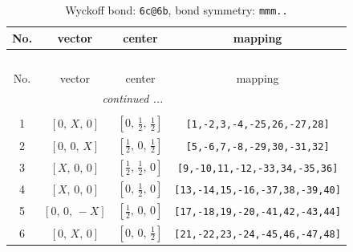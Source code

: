 \documentclass[fleqn,8pt]{jsarticle}
\begin{document}
\begin{longtable}{cccc}
\caption{Wyckoff bond: {\tt 6c@6b}, bond symmetry: {\tt mmm..}}
 \\
 \hline \hline
No. & vector & center & mapping \\ \hline \endfirsthead

\multicolumn{3}{l}{\tablename\ \thetable{}} \\
 \hline \hline
No. & vector & center & mapping \\ \hline \endhead

 \hline \hline
\multicolumn{3}{r}{\footnotesize\it continued ...} \\ \endfoot

 \hline \hline
\multicolumn{3}{r}{} \\ \endlastfoot

1 & $\left[ 0,\, X,\, 0 \right]$ & $\left[ 0,\, \frac{1}{2},\, \frac{1}{2} \right]$ & {\tt [1,-2,3,-4,-25,26,-27,28]} \\ \hline
2 & $\left[ 0,\, 0,\, X \right]$ & $\left[ \frac{1}{2},\, 0,\, \frac{1}{2} \right]$ & {\tt [5,-6,7,-8,-29,30,-31,32]} \\ \hline
3 & $\left[ X,\, 0,\, 0 \right]$ & $\left[ \frac{1}{2},\, \frac{1}{2},\, 0 \right]$ & {\tt [9,-10,11,-12,-33,34,-35,36]} \\ \hline
4 & $\left[ X,\, 0,\, 0 \right]$ & $\left[ 0,\, \frac{1}{2},\, 0 \right]$ & {\tt [13,-14,15,-16,-37,38,-39,40]} \\ \hline
5 & $\left[ 0,\, 0,\, - X \right]$ & $\left[ \frac{1}{2},\, 0,\, 0 \right]$ & {\tt [17,-18,19,-20,-41,42,-43,44]} \\ \hline
6 & $\left[ 0,\, X,\, 0 \right]$ & $\left[ 0,\, 0,\, \frac{1}{2} \right]$ & {\tt [21,-22,23,-24,-45,46,-47,48]} \\
\end{longtable}
\renewcommand{\arraystretch}{1.2}
\end{document}
